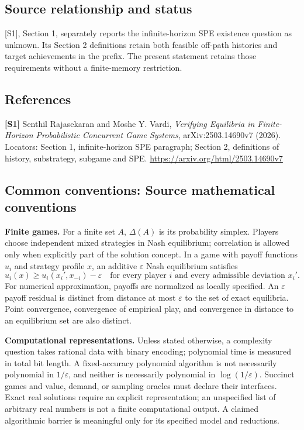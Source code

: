 \documentclass[11pt,a4paper]{article}
\begin{document}
\subsection*{Source relationship and status}
[S1], Section 1, separately reports the infinite-horizon SPE existence question as unknown. Its Section 2 definitions retain both feasible off-path histories and target achievements in the prefix. The present statement retains those requirements without a finite-memory restriction.
\subsection*{References}
\begingroup\footnotesize\raggedright
\textbf{[S1]} Senthil Rajasekaran and Moshe Y. Vardi, \emph{Verifying Equilibria in Finite-Horizon Probabilistic Concurrent Game Systems}, arXiv:2503.14690v7 (2026). Locators: Section 1, infinite-horizon SPE paragraph; Section 2, definitions of history, substrategy, subgame and SPE. \url{https://arxiv.org/html/2503.14690v7}
\par\endgroup

\subsection*{Common conventions: Source mathematical conventions}

\textbf{Finite games.} For a finite set $A$, $\Delta(A)$ is its probability
simplex. Players choose independent mixed strategies in Nash equilibrium;
correlation is allowed only when explicitly part of the solution concept.
In a game with payoff functions $u_i$ and strategy profile $x$, an additive
$\varepsilon$ Nash equilibrium satisfies
\[
 u_i(x)\geq u_i(x_i',x_{-i})-\varepsilon
 \quad\text{for every player $i$ and every admissible deviation $x_i'$}.
\]
For numerical approximation, payoffs are normalized as locally specified.
An $\varepsilon$ payoff residual is distinct from distance at most
$\varepsilon$ to the set of exact equilibria. Point convergence, convergence
of empirical play, and convergence in distance to an equilibrium set are
also distinct.

\textbf{Computational representations.} Unless stated otherwise, a complexity
question takes rational data with binary encoding; polynomial time is measured
in total bit length. A fixed-accuracy polynomial algorithm is not necessarily
polynomial in $1/\varepsilon$, and neither is necessarily polynomial in
$\log(1/\varepsilon)$. Succinct games and value, demand, or sampling oracles
must declare their interfaces. Exact real solutions require an explicit
representation; an unspecified list of arbitrary real numbers is not a
finite computational output. A claimed algorithmic barrier is meaningful
only for its specified model and reductions.
\end{document}
